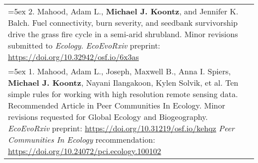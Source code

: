 \begin{longtable}{@{} >{\raggedright}p{6.10in} >{\raggedleft}X @{}}

\hangindent=5ex 2. Mahood, Adam L., \textbf{Michael J. Koontz}, and Jennifer K. Balch. Fuel connectivity, burn severity, and seedbank survivorship drive the grass fire cycle in a semi-arid shrubland. Minor revisions submitted to \emph{Ecology}. 
\newline \emph{EcoEvoRxiv} preprint: \href{https://doi.org/10.32942/osf.io/6x3as}{https://doi.org/10.32942/osf.io/6x3as} & \tabularnewline

\hangindent=5ex 1. Mahood, Adam L., Joseph, Maxwell B., Anna I. Spiers, \textbf{Michael J. Koontz}, Nayani Ilangakoon, Kylen Solvik, et al. Ten simple rules for working with high resolution remote sensing data. Recommended Article in Peer Communities In Ecology. Minor revisions requested for Global Ecology and Biogeography.
\newline \emph{EcoEvoRxiv} preprint: \href{https://doi.org/10.31219/osf.io/kehqz}{https://doi.org/10.31219/osf.io/kehqz} 
\newline \emph{Peer Communities In Ecology} recommendation: \href{https://doi.org/10.24072/pci.ecology.100102}{https://doi.org/10.24072/pci.ecology.100102} & \tabularnewline


\end{longtable}
